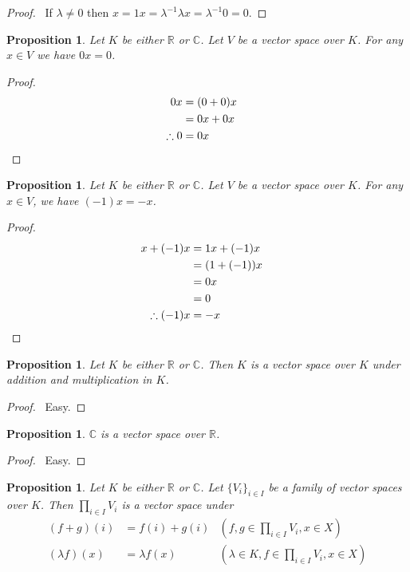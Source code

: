 \documentclass{book}
\let\qed\relax
\newtheorem{prop}[ax]{Proposition}
\theoremstyle{definition}
\begin{document}
\begin{proof}
\pf\ If $\lambda \neq 0$ then $x = 1x = \lambda^{-1} \lambda x = \lambda^{-1} 0 = 0$. \qed
\end{proof}

\begin{prop}
\label{prop:zerotimes}
Let $K$ be either $\mathbb{R}$ or $\mathbb{C}$. Let $V$ be a vector space over $K$. For any $x \in V$ we have $0x = 0$.
\end{prop}

\begin{proof}
\pf
\begin{align*}
0x & = (0 + 0) x \\
& = 0x + 0x \\
\therefore 0 & = 0x & \qed
\end{align*}
\end{proof}

\begin{prop}
Let $K$ be either $\mathbb{R}$ or $\mathbb{C}$. Let $V$ be a vector space over $K$. For any $x \in V$, we have $(-1)x = -x$.
\end{prop}

\begin{proof}
\pf
\begin{align*}
x + (-1)x & = 1x + (-1) x \\
& = (1 + (-1))x \\
& = 0 x \\
& = 0 \\
\therefore (-1)x & = -x & \qed
\end{align*}
\end{proof}

\begin{prop}
Let $K$ be either $\mathbb{R}$ or $\mathbb{C}$. Then $K$ is a vector space over $K$ under addition and multiplication in $K$.
\end{prop}

\begin{proof}
\pf\ Easy. \qed
\end{proof}

\begin{prop}
$\mathbb{C}$ is a vector space over $\mathbb{R}$.
\end{prop}

\begin{proof}
\pf\ Easy. \qed
\end{proof}

\begin{prop}
Let $K$ be either $\mathbb{R}$ or $\mathbb{C}$. Let $\{ V_i \}_{i \in I}$ be a family of vector spaces over $K$. Then $\prod_{i \in I} V_i$ is a vector space under
\begin{align*}
(f + g)(i) & = f(i) + g(i) & (f,g \in \prod_{i \in I} V_i, x \in X) \\
(\lambda f)(x) & = \lambda f(x) & (\lambda \in K, f \in \prod_{i \in I} V_i, x \in X)
\end{align*}
\end{prop}
\end{document}
